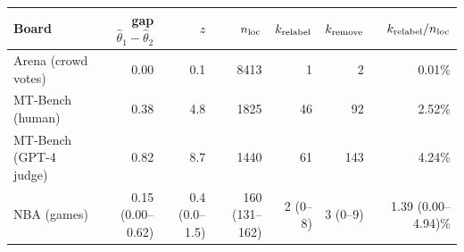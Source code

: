\begin{tabular}{lrrrrrr}\toprule
 Board & gap $\hat\theta_1-\hat\theta_2$ & $z$ & $n_{\rm loc}$ & $k_{\rm relabel}$ & $k_{\rm remove}$ & $k_{\rm relabel}/n_{\rm loc}$ \\\midrule
Arena (crowd votes) & 0.00 & 0.1 & 8413 & 1 & 2 & 0.01\% \\
MT-Bench (human) & 0.38 & 4.8 & 1825 & 46 & 92 & 2.52\% \\
MT-Bench (GPT-4 judge) & 0.82 & 8.7 & 1440 & 61 & 143 & 4.24\% \\
NBA (games) & 0.15 (0.00--0.62) & 0.4 (0.0--1.5) & 160 (131--162) & 2 (0--8) & 3 (0--9) & 1.39 (0.00--4.94)\% \\
\bottomrule\end{tabular}
